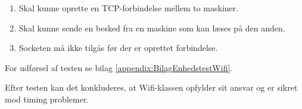 	\begin{enumerate}
	\item Skal kunne oprette en TCP-forbindelse mellem to maskiner.
	\item Skal kunne sende en besked fra en maskine som kan læses på den anden.
	\item Socketen må ikke tilgås før der er oprettet forbindelse.
	\end{enumerate}
	
For udførsel af testen se bilag \ref{appendix:BilagEnhedstestWifi}.

Efter testen kan det konkluderes, at Wifi-klassen opfylder sit ansvar og er sikret mod timing problemer.

%